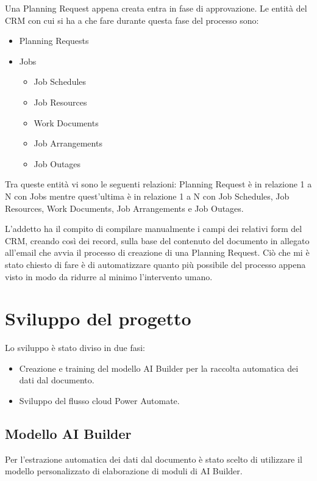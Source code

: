 Una Planning Request appena creata entra in fase di approvazione. Le entità del CRM con cui si ha a che fare durante questa fase del processo sono: 
\begin{itemize}
  \item Planning Requests
  \item Jobs \begin{itemize}
    \item Job Schedules 
    \item Job Resources
    \item Work Documents
    \item Job Arrangements
    \item Job Outages
  \end{itemize}
\end{itemize}

Tra queste entità vi sono le seguenti relazioni: Planning Request è in relazione 1 a N con Jobs mentre quest'ultima è in relazione 1 a N con Job Schedules, Job Resources, Work Documents, Job Arrangements e Job Outages.

L'addetto ha il compito di compilare manualmente i campi dei relativi form del CRM, creando così dei record, sulla base del contenuto del documento in allegato all'email che avvia il processo di creazione di una Planning Request. 
Ciò che mi è stato chiesto di fare è di automatizzare quanto più possibile del processo appena visto in modo da ridurre al minimo l'intervento umano.

\section{Sviluppo del progetto}
Lo sviluppo è stato diviso in due fasi: 
\begin{itemize}
  \item Creazione e training del modello AI Builder per la raccolta automatica dei dati dal documento.
  \item Sviluppo del flusso cloud Power Automate.
\end{itemize}
  
\subsection{Modello AI Builder}
\label{ssec:modelloAIBuilder}
Per l'estrazione automatica dei dati dal documento è stato scelto di utilizzare il modello personalizzato di elaborazione di moduli di AI Builder. 

